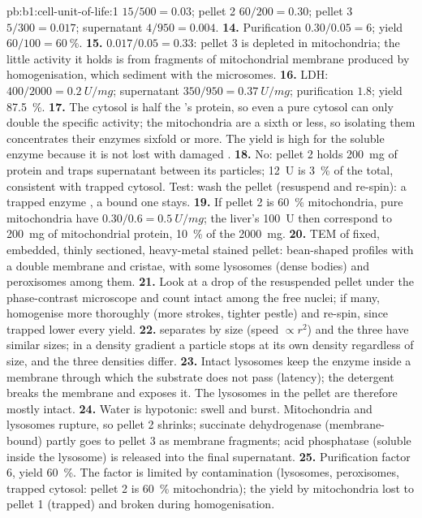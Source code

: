 \begin{solution}{pb:b1:cell-unit-of-life:1}
$15/500 = 0.03$; pellet 2 $60/200 = 0.30$; pellet 3 $5/300 = 0.017$;
supernatant $4/950 = 0.004$.
\textbf{14.} Purification $0.30/0.05 = 6$; yield $60/100 =
\qty{60}{\%}$.
\textbf{15.} $0.017/0.05 = 0.33$: pellet 3 is depleted in mitochondria; the little activity it holds is from fragments of mitochondrial membrane produced by homogenisation, which sediment with the microsomes.
\textbf{16.} LDH:  $400/2000 = \qty{0.2}{U/mg}$; supernatant
$350/950 = \qty{0.37}{U/mg}$; purification $1.8$; yield \qty{87.5}{\%}.
\textbf{17.} The cytosol is half the 's protein, so even a pure
cytosol can only double the specific activity; the mitochondria are a
sixth or less, so isolating them concentrates their enzymes sixfold or
more. The yield is high for the soluble enzyme because it is not lost
with damaged .
\textbf{18.} No: pellet 2 holds \qty{200}{mg} of protein and traps
supernatant between its particles; \qty{12}{U} is \qty{3}{\%} of the
total, consistent with trapped cytosol. Test: wash the pellet
(resuspend and re-spin): a trapped enzyme , a bound one stays.
\textbf{19.} If pellet 2 is \qty{60}{\%} mitochondria, pure mitochondria
have $0.30/0.6 = \qty{0.5}{U/mg}$; the liver's \qty{100}{U} then
correspond to \qty{200}{mg} of mitochondrial protein, \qty{10}{\%} of
the \qty{2000}{mg}.
\textbf{20.} TEM of fixed, embedded, thinly sectioned, heavy-metal
stained pellet: bean-shaped profiles with a double membrane and cristae,
with some lysosomes (dense bodies) and peroxisomes among them.
\textbf{21.} Look at a drop of the resuspended pellet under the phase-contrast microscope and count intact  among the free nuclei; if many, homogenise more thoroughly (more strokes, tighter pestle) and re-spin, since trapped  lower every yield.
\textbf{22.}  separates by size (speed
$\propto r^2$) and the three  have similar sizes; in a
density gradient a particle stops at its own density regardless of
size, and the three densities differ.
\textbf{23.} Intact lysosomes keep the enzyme inside a membrane through
which the substrate does not pass (latency); the detergent breaks the
membrane and exposes it. The lysosomes in the pellet are therefore
mostly intact.
\textbf{24.} Water is hypotonic:  swell and burst.
Mitochondria and lysosomes rupture, so pellet 2 shrinks; succinate
dehydrogenase (membrane-bound) partly goes to pellet 3 as membrane
fragments; acid phosphatase (soluble inside the lysosome) is released
into the final supernatant.
\textbf{25.} Purification factor $6$, yield \qty{60}{\%}. The factor
is limited by contamination (lysosomes, peroxisomes, trapped cytosol:
pellet 2 is \qty{60}{\%} mitochondria); the yield by mitochondria lost
to pellet 1 (trapped) and broken during homogenisation.
\end{solution}
